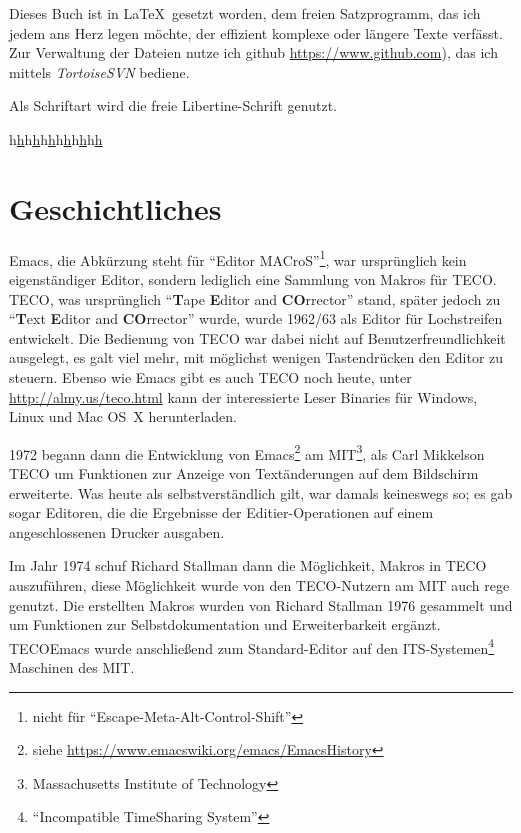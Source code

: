 \documentclass[12pt,ngerman]{scrbook}
\begin{document}
Dieses Buch ist in \LaTeX\ gesetzt worden, dem freien Satzprogramm, das ich jedem ans Herz legen möchte, der effizient komplexe oder längere Texte verfässt. Zur Verwaltung der Dateien nutze ich github \url{https://www.github.com}), das ich mittels \textit{TortoiseSVN} bediene. 

Als Schriftart wird die freie Libertine-Schrift genutzt.

\LKeyTab

h\url{h}h\url{h}h\url{h}h\url{h}h\url{h}h\url{h}


\mainmatter

\chapter{Geschichtliches}

Emacs, die Abkürzung steht für \enquote{Editor MACroS}\footnote{nicht für \enquote{Escape-Meta-Alt-Control-Shift}}, war ursprünglich kein eigenständiger Editor, sondern lediglich eine Sammlung von Makros für TECO. TECO, was ursprünglich \enquote{\textbf{T}ape \textbf{E}ditor and \textbf{CO}rrector} stand, später jedoch zu \enquote{\textbf{T}ext \textbf{E}ditor and \textbf{CO}rrector} wurde, wurde 1962/63 als Editor für Lochstreifen entwickelt. Die Bedienung von TECO war dabei nicht auf Benutzerfreundlichkeit ausgelegt, es galt viel mehr, mit möglichst wenigen Tastendrücken den Editor zu steuern. Ebenso wie Emacs gibt es auch TECO noch heute, unter \url{http://almy.us/teco.html} kann der interessierte Leser Binaries für Windows, Linux und Mac OS~X herunterladen. 

1972 begann dann die Entwicklung von Emacs\footnote{siehe \url{https://www.emacswiki.org/emacs/EmacsHistory}} am MIT\footnote{Massachusetts Institute of Technology}, als Carl Mikkelson TECO um Funktionen zur Anzeige von Textänderungen auf dem Bildschirm erweiterte. Was heute als selbstverständlich gilt, war damals keineswegs so; es gab sogar Editoren, die die Ergebnisse der Editier-Operationen auf einem angeschlossenen Drucker ausgaben.

Im Jahr 1974 schuf Richard Stallman dann die Möglichkeit, Makros in TECO auszuführen, diese Möglichkeit wurde von den TECO-Nutzern am MIT auch rege genutzt. Die erstellten Makros wurden von Richard Stallman 1976 gesammelt und um Funktionen zur Selbstdokumentation und Erweiterbarkeit ergänzt. TECOEmacs wurde anschließend zum Standard-Editor auf den ITS-Systemen\footnote{\enquote{Incompatible TimeSharing System}} Maschinen des MIT.
\end{document}

